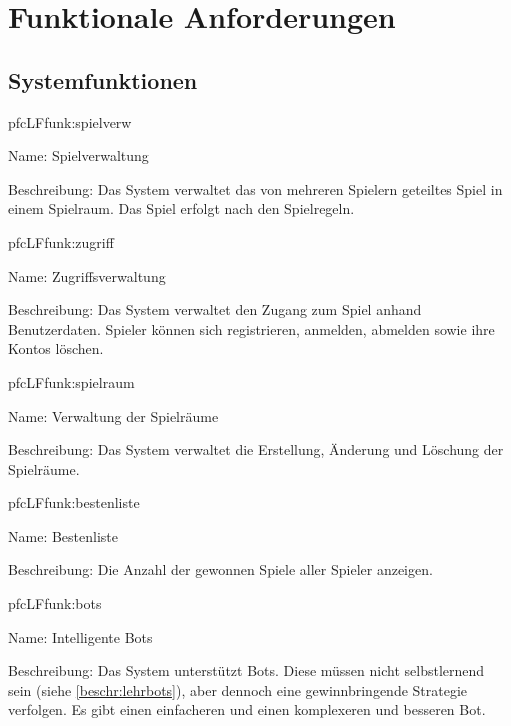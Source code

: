 \chapter{Funktionale Anforderungen}


\section{Systemfunktionen}

\setcounter{pfc}{10}

\begin{description}[leftmargin=5em, style=sameline]
	
	\begin{lhp}{pfc}{LF}{funk:spielverw}
		\item [Name:] Spielverwaltung
		\item [Beschreibung:] Das System verwaltet das von mehreren Spielern geteiltes Spiel in einem Spielraum. Das Spiel erfolgt nach den Spielregeln.
	\end{lhp}
	
	\begin{lhp}{pfc}{LF}{funk:zugriff}
		\item [Name:] Zugriffsverwaltung
		\item [Beschreibung:] Das System verwaltet den Zugang zum Spiel anhand Benutzerdaten. Spieler können sich registrieren, anmelden, abmelden sowie ihre Kontos löschen.
	\end{lhp}

	\begin{lhp}{pfc}{LF}{funk:spielraum}
		\item [Name:] Verwaltung der Spielräume
		\item [Beschreibung:] Das System verwaltet die Erstellung, Änderung und Löschung der Spielräume.
	\end{lhp}
	
	\begin{lhp}{pfc}{LF}{funk:bestenliste}
		\item [Name:] Bestenliste
		\item [Beschreibung:] Die Anzahl der gewonnen Spiele aller Spieler anzeigen.
	\end{lhp}
	
	\begin{lhp}{pfc}{LF}{funk:bots}
		\item [Name:] Intelligente Bots
		\item [Beschreibung:] Das System unterstützt Bots. Diese müssen nicht selbstlernend sein (siehe \ref{beschr:lehrbots}), aber dennoch eine gewinnbringende Strategie verfolgen. Es gibt einen einfacheren und einen komplexeren und besseren Bot.
	\end{lhp}
	

\end{description}
